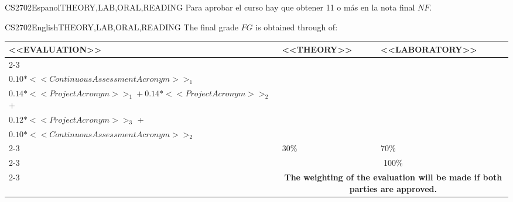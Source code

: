 \begin{evaluation}{CS2702}{Espanol}{THEORY,LAB,ORAL,READING}
  \noindent Para aprobar el curso hay que obtener 11 o más en la nota final $NF$.
  \end{evaluation}
 
  \begin{evaluation}{CS2702}{English}{THEORY,LAB,ORAL,READING}
  The final grade $FG$ is obtained through of:
  
  \begin{tabularx}{0.9\textwidth}{|X|p{}|p{}|} \hline
    \multirow{4}{*}{\uppercase{<<Evaluation>>}} & \uppercase{<<Theory>>} & \uppercase{<<Laboratory>>} \\ \cline{2-3}
    & %
        \begin{minipage}{0.95\textwidth}
        \begin{tabular}{l}
            $0.10*<<PracticalTestAcronym>>_{1} + 0.10*<<PracticalTestAcronym>>_{2}$ + \\  
            $0.10*<<ContinuousAssessmentAcronym>>_{1}$
        \end{tabular} 
        \end{minipage} 
    & %
        \begin{minipage}{0.95\textwidth}
        \begin{tabular}{l}
            $0.10*<<PracticalTestAcronym>>_{3} + 0.10*<<PracticalTestAcronym>>_{4}$ + \\ 
            $0.14*<<ProjectAcronym>>_{1} + 0.14*<<ProjectAcronym>>_{2}$  +\\
            $0.12*<<ProjectAcronym>>_{3}$ +\\
            $0.10*<<ContinuousAssessmentAcronym>>_{2}$
            \end{tabular} 
        \end{minipage}                 \\ \cline{2-3}
    
    & %
    30\% 
    & %
    70\% \\ \cline{2-3}
    & \multicolumn{2}{c|}{100\%}  \\ \cline{2-3}
    & \multicolumn{2}{c|}{\textbf{The weighting of the evaluation will be made if both parties are approved.}}  \\ \hline
    \end{tabularx}
    

\end{evaluation}
